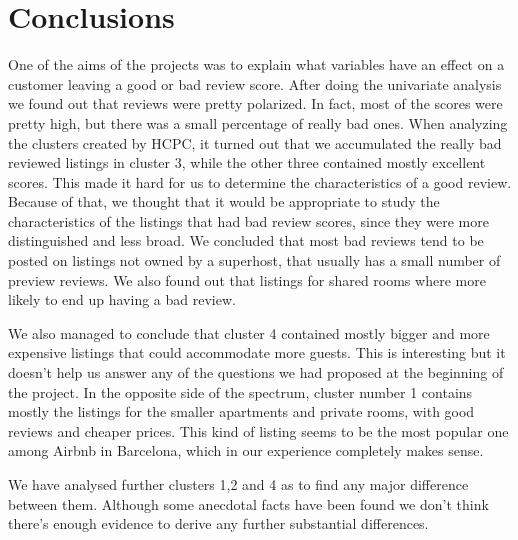 

\section{Conclusions}%
\label{sec:conclusions}

One of the aims of the projects was to explain what variables have an effect on a customer leaving a good or bad review score. After doing the univariate analysis we found out that reviews were pretty polarized.  In fact, most of the scores were pretty high, but there was a small percentage of really bad ones. When analyzing the clusters created by HCPC, it turned out that we accumulated the really bad reviewed listings in cluster 3, while the other three contained mostly excellent scores. This made it hard for us to determine the characteristics of a good review. Because of that, we thought that it would be appropriate to study the characteristics of the listings that had bad review scores, since they were more distinguished and less broad. We concluded that most bad reviews tend to be posted on listings not owned by a superhost, that usually has a small number of preview reviews. We also found out that listings for shared rooms where more likely to end up having a bad review.

We also managed to conclude that cluster 4 contained mostly bigger and more expensive listings that could accommodate more guests. This is interesting but it doesn't help us answer any of the questions we had proposed at the beginning of the project.
In the opposite side of the spectrum,  cluster number 1 contains mostly the listings for the smaller apartments and private rooms, with good reviews and cheaper prices. This kind of listing seems to be the most popular one among Airbnb in Barcelona, which in our experience completely makes sense.

We have analysed further clusters 1,2 and 4 as to find any major difference between them. Although some anecdotal facts have been found we don't think there's enough evidence to derive any further substantial differences.